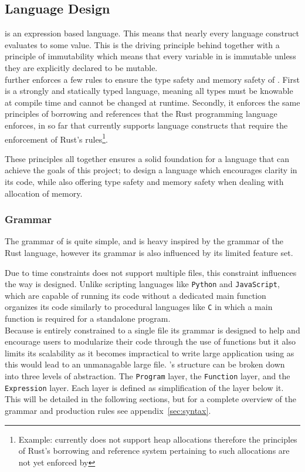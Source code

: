 \subsection{Language Design}
\label{sec:LanguageDesign}

\lang{} is an expression based language. This means that nearly every language construct
evaluates to some value\cite{Expr-Lang}. This is the driving principle behind
\lang{} together with a principle of immutability which means that every variable in
\lang{} is immutable unless they are explicitly declared to be mutable. \\ 

\lang{} further enforces a few rules to ensure the
type safety and memory safety of \lang{}. First \lang{} is a strongly and statically
typed language, meaning all types must be knowable at compile time and cannot be
changed at runtime. Secondly, it enforces the same principles of borrowing and
references that the Rust programming language enforces, in so far that \lang{}
currently supports language constructs that require the enforcement of Rust's
rules\footnote{Example: \lang{} currently does not support heap allocations therefore
the principles of Rust's borrowing and reference system pertaining to such allocations
are not yet enforced by \lang{}}.

These principles all together ensures a solid foundation for a language that can
achieve the goals of this project; to design a language which encourages clarity in
its code, while also offering type safety and memory safety when dealing with
allocation of memory.

\subsubsection{Grammar}

The grammar of \lang{} is quite simple, and is heavy inspired by the grammar of the
Rust language, however its grammar is also influenced by its limited feature set. 

Due to time constraints \lang{} does not support multiple files, this constraint
influences the way \lang{} is designed. Unlike scripting languages like
\texttt{Python} and \texttt{JavaScript}, which are capable of running its code without
a dedicated main function \lang{} organizes its code similarly to procedural
languages like \texttt{C} in which a main function is required for a standalone
program. \\

Because \lang{} is entirely constrained to a single file its grammar is designed to
help and encourage users to modularize their code through the use of functions but it
also limits its scalability as it becomes impractical to write large application
using \lang{} as this would lead to an unmanagable large file. \lang{}'s structure
can be broken down into three levels of abstraction. The \texttt{Program} layer, the
\texttt{Function} layer, and the \texttt{Expression} layer. Each layer is defined as
simplification of the layer below it. This will be detailed in the following
sections, but for a complete overview of the \lang{} grammar and production rules see
appendix~\ref{sec:syntax}.

